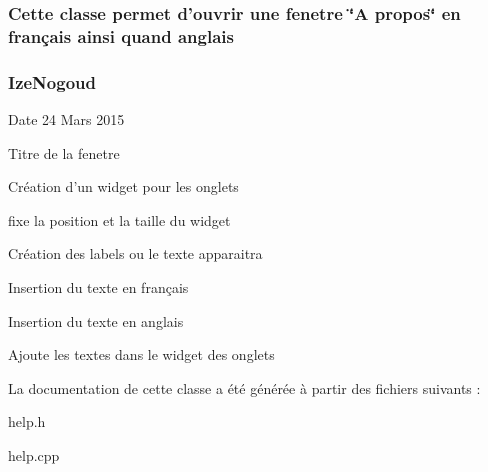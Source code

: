 \subsubsection*{Cette classe permet d'ouvrir une fenetre \char`\"{}\-A propos\char`\"{} en français ainsi quand anglais }



 

\subsubsection*{Ize\-Nogoud }

\begin{DoxyDate}{Date}
24 Mars 2015 
\end{DoxyDate}
Titre de la fenetre

Création d'un widget pour les onglets

fixe la position et la taille du widget

Création des labels ou le texte apparaitra

Insertion du texte en français

Insertion du texte en anglais

Ajoute les textes dans le widget des onglets 

La documentation de cette classe a été générée à partir des fichiers suivants \-:\begin{DoxyCompactItemize}
\item 
help.\-h\item 
help.\-cpp\end{DoxyCompactItemize}
